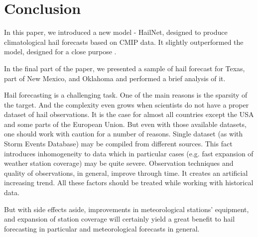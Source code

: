 \documentclass[conference]{IEEEtran}
\begin{document}
\section{Conclusion}

In this paper, we introduced a new model - HailNet, designed to produce climatological hail forecasts based on CMIP data. It slightly outperformed the model, designed for a close purpose \cite{PREIN201810}.

In the final part of the paper, we presented a sample of hail forecast for Texas, part of New Mexico, and Oklahoma and performed a brief analysis of it.

Hail forecasting is a challenging task. One of the main reasons is the sparsity of the target. And the complexity even grows when scientists do not have a proper dataset of hail observations. It is the case for almost all countries except the USA and some parts of the European Union. But even with those available datasets, one should work with caution for a number of reasons. Single dataset (as with Storm Events Database) may be compiled from different sources. This fact introduces inhomogeneity to data which in particular cases (e.g. fast expansion of weather station coverage) may be quite severe. Observation techniques and quality of observations, in general, improve through time. It creates an artificial increasing trend. All these factors should be treated while working with historical data.

But with side effects aside, improvements in meteorological stations' equipment, and expansion of station coverage will certainly yield a great benefit to hail forecasting in particular and meteorological forecasts in general.



\end{document}
